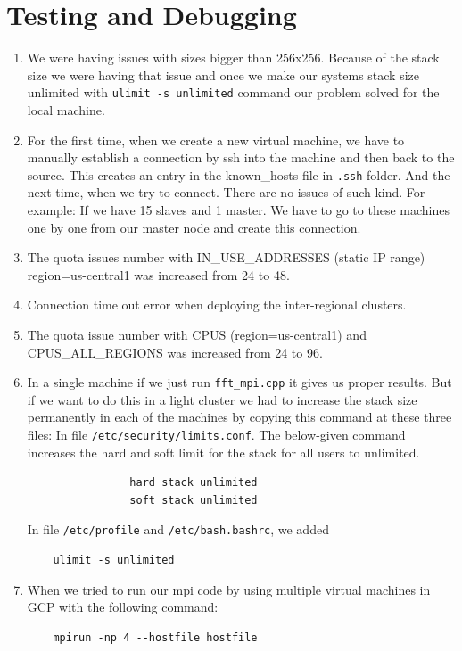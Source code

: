 \documentclass{article}
\begin{document}
\section{Testing and Debugging}
\begin{enumerate}
    \item We were having issues with sizes bigger than 256x256. Because of the stack size we were having that issue and once we make our systems stack size unlimited with \texttt{ulimit -s unlimited} command our problem solved for the local machine.
    \item For the first time, when we create a new virtual machine, we have to manually establish a connection by ssh into the machine and then back to the source. This creates an entry in the known\_hosts file in \texttt{.ssh} folder. And the next time, when we try to connect. There are no issues of such kind. For example: If we have 15 slaves and 1 master. We have to go to these machines one by one from our master node and create this connection.
    \item The quota issues number with IN\_USE\_ADDRESSES (static IP range) region=us-central1 was increased from 24 to 48. 
    \item Connection time out error when deploying the inter-regional clusters. \item The quota issue number with CPUS (region=us-central1) and CPUS\_ALL\_REGIONS was increased from 24 to 96.
    \item In a single machine if we just run \texttt{fft\_mpi.cpp} it gives us proper results. But if we want to do this in a light cluster we had to increase the stack size permanently in each of the machines by copying this command at these three files:
    In file \texttt{/etc/security/limits.conf}. The below-given command increases the hard and soft limit for the stack for all users to unlimited.
    \begin{verbatim}
                hard stack unlimited
                soft stack unlimited
    \end{verbatim}
        In file \texttt{/etc/profile} and \texttt{/etc/bash.bashrc}, we added
    \begin{verbatim}
    ulimit -s unlimited
    \end{verbatim}
    \item When we tried to run our mpi code by using multiple virtual machines in GCP with the following command:
    \begin{verbatim}
    mpirun -np 4 --hostfile hostfile
    \end{verbatim}

\end{enumerate}
\end{document}
